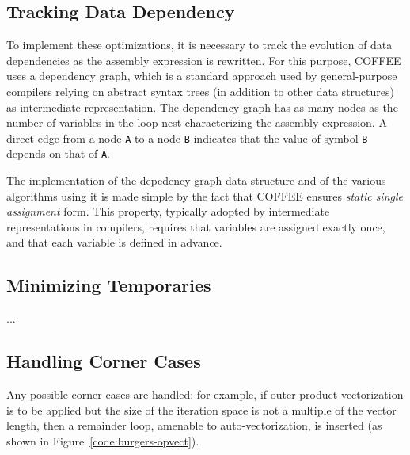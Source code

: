 %


\subsection{Tracking Data Dependency}
To implement these optimizations, it is necessary to track the evolution of data dependencies as the assembly expression is rewritten. For this purpose, COFFEE uses a dependency graph, which is a standard approach used by general-purpose compilers relying on abstract syntax trees (in addition to other data structures) as intermediate representation. The dependency graph has as many nodes as the number of variables in the loop nest characterizing the assembly expression. A direct edge from a node \texttt{A} to a node \texttt{B} indicates that the value of symbol \texttt{B} depends on that of \texttt{A}. 

The implementation of the depedency graph data structure and of the various algorithms using it is made simple by the fact that COFFEE ensures \textit{static single assignment} form. This property, typically adopted by intermediate representations in compilers, requires that variables are assigned exactly once, and that each variable is defined in advance. 

\subsection{Minimizing Temporaries}
...

\subsection{Handling Corner Cases}
Any possible corner cases are handled: for example, if outer-product vectorization is to be applied but the size of the iteration space is not a multiple of the vector length, then a remainder loop, amenable to auto-vectorization, is inserted (as shown in Figure~\ref{code:burgers-opvect}).